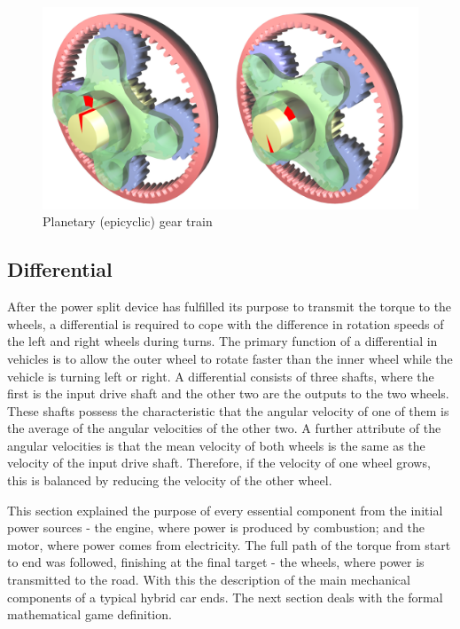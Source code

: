 \begin{figure}[h]
\centering
\includegraphics[scale=0.15]{figures/planetaryGear}
\caption{Planetary (epicyclic) gear train \citep{planetaryGear}}
\label{fig:planGear}
\end{figure}

\subsection{Differential}
After the power split device has fulfilled its purpose to transmit the torque to the wheels, a differential is required to cope with the difference in rotation speeds of the left and right wheels during turns. The primary function of a differential in vehicles is to allow the outer wheel to rotate faster than the inner wheel while the vehicle is turning left or right. A differential consists of three shafts, where the first is the input drive shaft and the other two are the outputs to the two wheels. These shafts possess the characteristic that the angular velocity of one of them is the average of the angular velocities of the other two. A further attribute of the angular velocities is that the mean velocity of both wheels is the same as the velocity of the input drive shaft. Therefore, if the velocity of one wheel grows, this is balanced by reducing the velocity of the other wheel.

This section explained the purpose of every essential component from the initial power sources - the engine, where power is produced by combustion; and the motor, where power comes from electricity. The full path of the torque from start to end was followed, finishing at the final target - the wheels, where power is transmitted to the road. With this the description of the main mechanical components of a typical hybrid car ends. The next section deals with the formal mathematical game definition.

